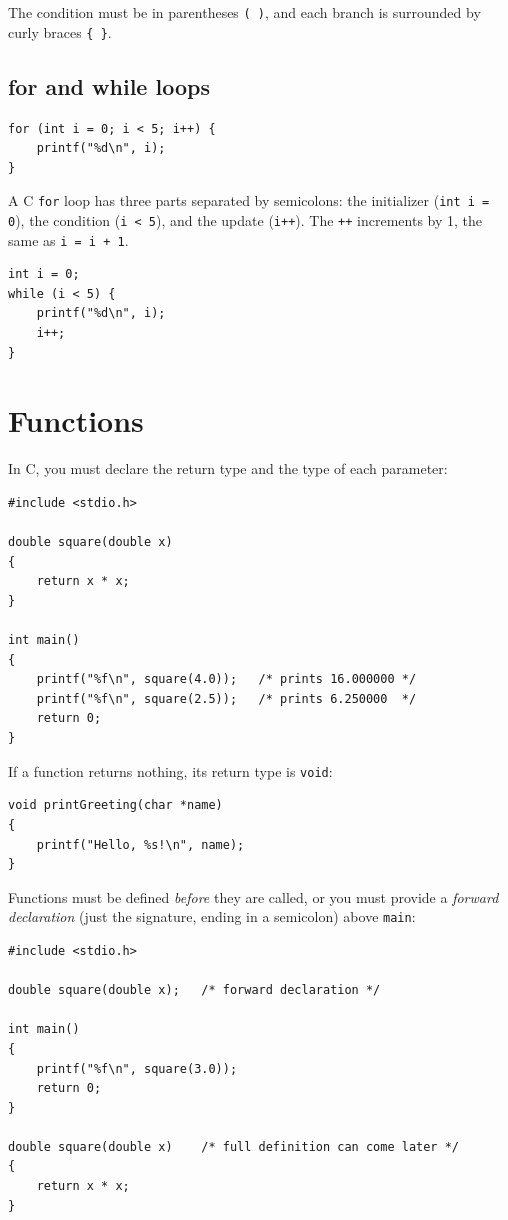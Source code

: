 The condition must be in parentheses \texttt{( )}, and each branch is
surrounded by curly braces \texttt{\{ \}}.

\subsection{for and while loops}

\begin{verbatim}
for (int i = 0; i < 5; i++) {
    printf("%d\n", i);
}
\end{verbatim}

A C \texttt{for} loop has three parts separated by semicolons: the
initializer (\texttt{int i = 0}), the condition (\texttt{i < 5}), and
the update (\texttt{i++}).  The \texttt{++} increments by 1, the same
as \texttt{i = i + 1}.

\begin{verbatim}
int i = 0;
while (i < 5) {
    printf("%d\n", i);
    i++;
}
\end{verbatim}

\section{Functions}

In C, you must declare the return type and the type of each parameter:

\begin{verbatim}
#include <stdio.h>

double square(double x)
{
    return x * x;
}

int main()
{
    printf("%f\n", square(4.0));   /* prints 16.000000 */
    printf("%f\n", square(2.5));   /* prints 6.250000  */
    return 0;
}
\end{verbatim}

If a function returns nothing, its return type is \texttt{void}:

\begin{verbatim}
void printGreeting(char *name)
{
    printf("Hello, %s!\n", name);
}
\end{verbatim}

Functions must be defined \emph{before} they are called, or you must
provide a \emph{forward declaration} (just the signature, ending in a
semicolon) above \texttt{main}:

\begin{verbatim}
#include <stdio.h>

double square(double x);   /* forward declaration */

int main()
{
    printf("%f\n", square(3.0));
    return 0;
}

double square(double x)    /* full definition can come later */
{
    return x * x;
}
\end{verbatim}

